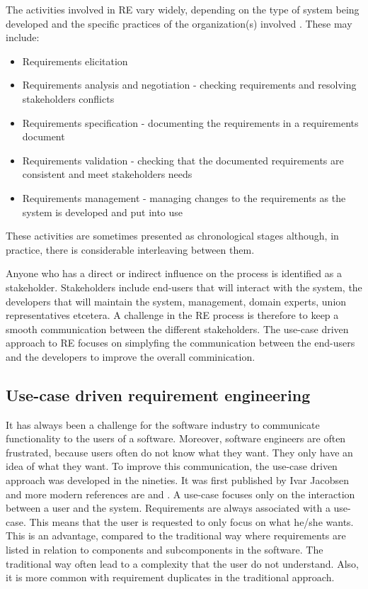 The activities involved in RE vary widely, depending on the type of system being developed and the specific practices of the organization(s) involved  \cite{Som11}.  These may include:
\begin{itemize}
\item Requirements elicitation 
\item Requirements analysis and negotiation - checking requirements and resolving stakeholders conflicts
\item Requirements specification - documenting the requirements in a requirements document
\item Requirements validation - checking that the documented requirements are consistent and meet stakeholders needs
\item Requirements management - managing changes to the requirements as the system is developed and put into use
\end{itemize}

These activities are sometimes presented as chronological stages although, in practice, there is considerable interleaving between them.  

Anyone who has a direct or indirect influence on the process is identified as a stakeholder.   Stakeholders include end-users that will interact with the system, the developers that will maintain the system, management, domain experts, union representatives etcetera.  A challenge in the RE process is therefore to keep a smooth communication between the different stakeholders.  The use-case driven approach to RE focuses on simplyfing the communication between the end-users and the developers to improve the overall comminication.

\subsection{Use-case driven requirement engineering}

It has always been a challenge for the software industry to communicate functionality to the users of a software. Moreover, software engineers are often frustrated, because users often do not know what they want. They only have an idea of what they want.  To improve this communication, the use-case driven approach was developed in the nineties.  It was first published by Ivar Jacobsen \cite{Jac92} and more modern references are \cite{Poh10} and \cite{Coc01}.  A use-case focuses only on the interaction between a user and the system.  Requirements are always associated with a use-case. This means that the user is requested to only focus on what he/she wants.  This is an advantage, compared to the traditional way where requirements are listed in relation to components and subcomponents in the software.  The traditional way often lead to a complexity that the user do not understand.  Also, it is more common with requirement duplicates in the traditional approach.

